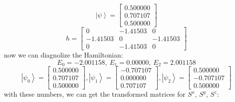 \documentclass[letter]{article}
\begin{document}
$$
\left|\psi\right>=\begin{bmatrix}
    0.500000 \\
0.707107 \\
0.500000
    \end{bmatrix}
$$
$$
h=\begin{bmatrix}
    0 & -1.41503 & 0 \\
    -1.41503 &  0 & -1.41503 \\
    0 &  -1.41503 & 0
    \end{bmatrix}
$$
now we can diagnolize the Hamiltonian:
$$E_{0}=-2.001158,\ E_{1}=0.00000,\ E_{2}=2.001158
$$
$$\left|\psi_0\right>=\begin{bmatrix}
    0.500000 \\
0.707107 \\
0.500000
    \end{bmatrix},\left|\psi_1\right>=\begin{bmatrix}
       -0.707107 \\
    0.000000 \\
    0.707107
        \end{bmatrix},\left|\psi_2\right>=\begin{bmatrix}
            0.500000 \\
        -0.707107 \\
        0.500000
            \end{bmatrix}
$$
with these numbers, we can get the transformed matrices for $S^x$, $S^y$, $S^z$:
\end{document}
